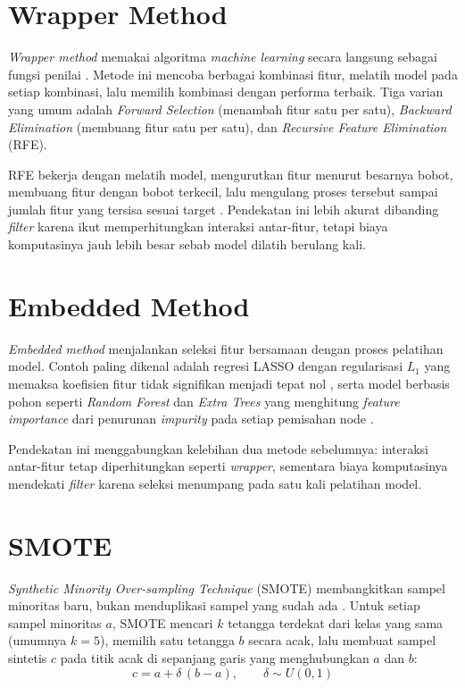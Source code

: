 \documentclass[a4paper,oneside,12pt]{report}
\begin{document}
\section{Wrapper Method}
\textit{Wrapper method} memakai algoritma \textit{machine learning} secara langsung sebagai fungsi penilai \cite{kohavi1997}. Metode ini mencoba berbagai kombinasi fitur, melatih model pada setiap kombinasi, lalu memilih kombinasi dengan performa terbaik. Tiga varian yang umum adalah \textit{Forward Selection} (menambah fitur satu per satu), \textit{Backward Elimination} (membuang fitur satu per satu), dan \textit{Recursive Feature Elimination} (RFE).

RFE bekerja dengan melatih model, mengurutkan fitur menurut besarnya bobot, membuang fitur dengan bobot terkecil, lalu mengulang proses tersebut sampai jumlah fitur yang tersisa sesuai target \cite{guyon2002}. Pendekatan ini lebih akurat dibanding \textit{filter} karena ikut memperhitungkan interaksi antar-fitur, tetapi biaya komputasinya jauh lebih besar sebab model dilatih berulang kali.

\section{Embedded Method}
\textit{Embedded method} menjalankan seleksi fitur bersamaan dengan proses pelatihan model. Contoh paling dikenal adalah regresi LASSO dengan regularisasi $L_1$ yang memaksa koefisien fitur tidak signifikan menjadi tepat nol \cite{tibshirani1996}, serta model berbasis pohon seperti \textit{Random Forest} dan \textit{Extra Trees} yang menghitung \textit{feature importance} dari penurunan \textit{impurity} pada setiap pemisahan node \cite{breiman2001}.

Pendekatan ini menggabungkan kelebihan dua metode sebelumnya: interaksi antar-fitur tetap diperhitungkan seperti \textit{wrapper}, sementara biaya komputasinya mendekati \textit{filter} karena seleksi menumpang pada satu kali pelatihan model.

\section{SMOTE}
\textit{Synthetic Minority Over-sampling Technique} (SMOTE) membangkitkan sampel minoritas baru, bukan menduplikasi sampel yang sudah ada \cite{chawla2002}. Untuk setiap sampel minoritas $a$, SMOTE mencari $k$ tetangga terdekat dari kelas yang sama (umumnya $k = 5$), memilih satu tetangga $b$ secara acak, lalu membuat sampel sintetis $c$ pada titik acak di sepanjang garis yang menghubungkan $a$ dan $b$:
\begin{equation}
c = a + \delta \, (b - a), \qquad \delta \sim U(0, 1)
\end{equation}
\end{document}
